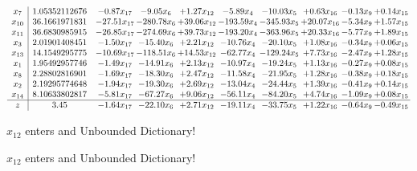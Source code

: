 \documentclass[9pt]{article}
\begin{document}
 \[\begin{array}{c| c c@{\hskip 2pt} c@{\hskip 2pt} c@{\hskip 2pt} c@{\hskip 2pt} c@{\hskip 2pt} c@{\hskip 2pt} c@{\hskip 2pt} c@{\hskip 2pt} }
 x_{7}   &  1.05352112676 & -0.87 x_{17} & -9.05 x_{6} & +  1.27 x_{12} & -5.89 x_{4} & -10.03 x_{5} & +  0.63 x_{16} & -0.13 x_{9} & +  0.14 x_{15}\\
 x_{10}   &  36.1661971831 & -27.51 x_{17} & -280.78 x_{6} & + 39.06 x_{12} & -193.59 x_{4} & -345.93 x_{5} & + 20.07 x_{16} & -5.34 x_{9} & +  1.57 x_{15}\\
 x_{11}   &  36.6830985915 & -26.85 x_{17} & -274.69 x_{6} & + 39.73 x_{12} & -193.20 x_{4} & -363.96 x_{5} & + 20.33 x_{16} & -5.77 x_{9} & +  1.89 x_{15}\\
 x_{3}   &  2.01901408451 & -1.50 x_{17} & -15.40 x_{6} & +  2.21 x_{12} & -10.76 x_{4} & -20.10 x_{5} & +  1.08 x_{16} & -0.34 x_{9} & +  0.06 x_{15}\\
 x_{13}   &  14.1549295775 & -10.69 x_{17} & -118.51 x_{6} & + 14.53 x_{12} & -62.77 x_{4} & -129.24 x_{5} & +  7.73 x_{16} & -2.47 x_{9} & +  1.28 x_{15}\\
 x_{1}   &  1.95492957746 & -1.49 x_{17} & -14.91 x_{6} & +  2.13 x_{12} & -10.97 x_{4} & -19.24 x_{5} & +  1.13 x_{16} & -0.27 x_{9} & +  0.08 x_{15}\\
 x_{8}   &  2.28802816901 & -1.69 x_{17} & -18.30 x_{6} & +  2.47 x_{12} & -11.58 x_{4} & -21.95 x_{5} & +  1.28 x_{16} & -0.38 x_{9} & +  0.18 x_{15}\\
 x_{2}   &  2.19295774648 & -1.94 x_{17} & -19.30 x_{6} & +  2.69 x_{12} & -13.04 x_{4} & -24.44 x_{5} & +  1.39 x_{16} & -0.41 x_{9} & +  0.14 x_{15}\\
 x_{14}   &  8.10633802817 & -5.81 x_{17} & -67.27 x_{6} & +  9.06 x_{12} & -56.11 x_{4} & -84.20 x_{5} & +  4.74 x_{16} & -1.09 x_{9} & +  0.08 x_{15}\\
\hline
z    &  3.45 & -1.64 x_{17} & -22.10 x_{6} & +  2.71 x_{12} & -19.11 x_{4} & -33.75 x_{5} & +  1.22 x_{16} & -0.64 x_{9} & -0.49 x_{15}\\
\end{array}\]


 $ x_{12} $ enters and Unbounded Dictionary!


 $ x_{12} $ enters and Unbounded Dictionary!
\end{document}
